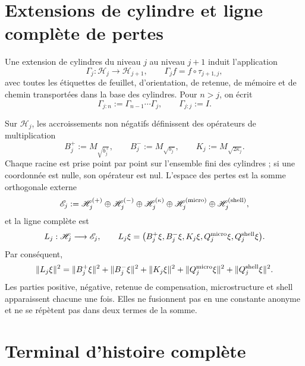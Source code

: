 \section{Extensions de cylindre et ligne complète de pertes}
\label{sec:pdfv2-sol-gamma-loss}

Une extension de cylindres du niveau \(j\) au niveau \(j+1\) induit l'application
\begin{equation}\label{eq:pdfv2-sol-gamma}
 \Gamma_j:\mathscr H_j\longrightarrow\mathscr H_{j+1},
 \qquad
 \Gamma_j f=f\circ\tau_{j+1,j},
\end{equation}
avec toutes les étiquettes de feuillet, d'orientation, de retenue, de mémoire et de chemin
transportées dans la base des cylindres. Pour \(n>j\), on écrit
\begin{equation}\label{eq:pdfv2-sol-gamma-composition}
 \Gamma_{j:n}:=\Gamma_{n-1}\cdots\Gamma_j,
 \qquad
 \Gamma_{j:j}:=I.
\end{equation}

Sur \(\mathscr H_j\), les accroissements non négatifs définissent des opérateurs de
multiplication
\begin{equation}\label{eq:pdfv2-sol-loss-multipliers}
 B_j^+:=M_{\sqrt{b_j^+}},
 \qquad
 B_j^-:=M_{\sqrt{b_j^-}},
 \qquad
 K_j:=M_{\sqrt{2\kappa_j}}.
\end{equation}
Chaque racine est prise point par point sur l'ensemble fini des cylindres ; si une
coordonnée est nulle, son opérateur est nul. L'espace des pertes est la somme
orthogonale externe
\[
 \mathscr E_j
 :=\mathscr H_j^{(+)}\oplus\mathscr H_j^{(-)}
   \oplus\mathscr H_j^{(\kappa)}
   \oplus\mathscr H_j^{({\rm micro})}
   \oplus\mathscr H_j^{({\rm shell})},
\]
et la ligne complète est
\begin{equation}\label{eq:pdfv2-sol-loss-row}
 L_j:\mathscr H_j\longrightarrow\mathscr E_j,
 \qquad
 L_j\xi
 =\bigl(
 B_j^+\xi,B_j^-\xi,K_j\xi,
 Q_j^{\rm micro}\xi,Q_j^{\rm shell}\xi
 \bigr).
\end{equation}
Par conséquent,
\begin{equation}\label{eq:pdfv2-sol-loss-norm}
 \|L_j\xi\|^2
 =\|B_j^+\xi\|^2+\|B_j^-\xi\|^2+\|K_j\xi\|^2
  +\|Q_j^{\rm micro}\xi\|^2
  +\|Q_j^{\rm shell}\xi\|^2.
\end{equation}
Les parties positive, négative, retenue de compensation, microstructure et shell
apparaissent chacune une fois. Elles ne fusionnent pas en une constante anonyme et ne se
répètent pas dans deux termes de la somme.

\section{Terminal d'histoire complète}
\label{sec:pdfv2-sol-terminal}

